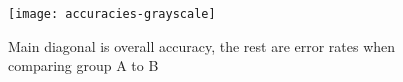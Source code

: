 \begin{figure}[!ht]
\centering
\texttt{[image: accuracies-grayscale]}
\caption{Main diagonal is overall accuracy, the rest are error rates when comparing group A to B}
\label{fullacc}
\end{figure}